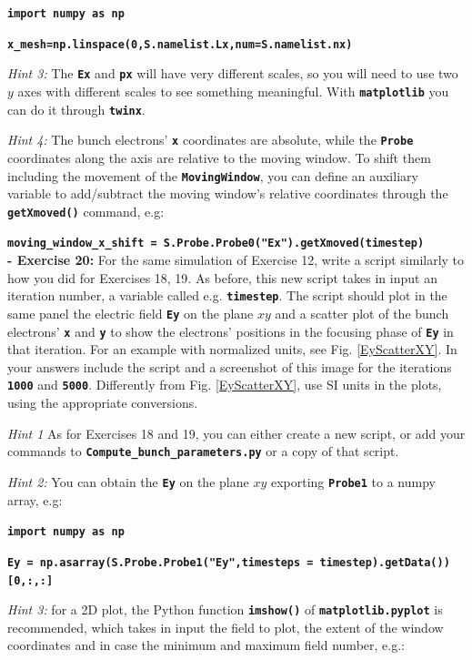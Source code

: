 \documentclass[a4paper,12pt]{extarticle}
\newcommand{\commandline}[1]{\texttt{\textbf{#1}}}
\begin{document}
\commandline{import numpy as np}

\commandline{x\_mesh=np.linspace(0,S.namelist.Lx,num=S.namelist.nx)}

\textit{Hint 3:} The \commandline{Ex} and \commandline{px} will have very different scales, so you will need to use two $y$ axes with different scales to see something meaningful. With \commandline{matplotlib} you can do it through \commandline{twinx}.

\textit{Hint 4:} The bunch electrons' \commandline{x} coordinates are absolute, while the \commandline{Probe} coordinates along the axis are relative to the moving window. To shift them including the movement of the \commandline{MovingWindow}, you can define an auxiliary variable to add/subtract the moving window's relative coordinates through the \commandline{getXmoved()} command, e.g:

\commandline{moving\_window\_x\_shift = S.Probe.Probe0("Ex").getXmoved(timestep)}
\\



\textbf{- Exercise 20:} For the same simulation of Exercise 12, write a script similarly to how you did for Exercises 18, 19.  As before, this new script takes in input an iteration number, a variable called e.g. \commandline{timestep}. The script should plot in the same panel the electric field \commandline{Ey} on the plane $xy$ and a scatter plot of the bunch electrons' \commandline{x} and \commandline{y} to show the electrons' positions in the focusing phase of \commandline{Ey} in that iteration. For an example with normalized units, see Fig. \ref{EyScatterXY}. In your answers include the script and a screenshot of this image for the iterations \commandline{1000} and \commandline{5000}. Differently from Fig.  \ref{EyScatterXY}, use SI units in the plots, using the appropriate conversions.


\textit{Hint 1} As for Exercises 18 and 19, you can either create a new script, or add your commands to \commandline{Compute\_bunch\_parameters.py} or a copy of that script.

\textit{Hint 2:} You can obtain the \commandline{Ey} on the plane $xy$ exporting \commandline{Probe1} to a numpy array, e.g:

\commandline{import numpy as np}

\commandline{Ey = np.asarray(S.Probe.Probe1("Ey",timesteps = timestep).getData())[0,:,:]}

\textit{Hint 3:} for a 2D plot, the Python function \commandline{imshow()} of \commandline{matplotlib.pyplot} is recommended, which takes in input the field to plot, the extent of the window coordinates and in case the minimum and maximum field number, e.g.:
\end{document}

